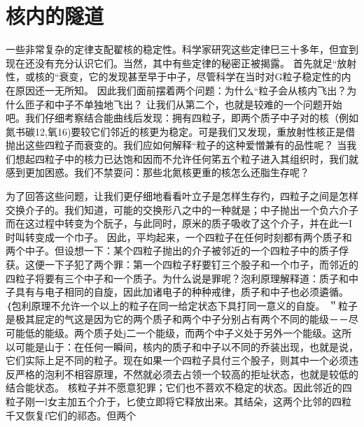 \section{核内的隧道}

一些非常复杂的定律支配翟核的稳定性。科学家研究这些定律巳三十多年，但宜到现在还没有充分认识它们。当然，其中有些定律的秘密正被揭露。
首先就足“放射性，或核的“衰变，它的发现甚至早于中子，尽管科学在当时对G粒子稳定性的内在原因还一无所知。
因此我们面前摆着两个问题：为什么“粒子会从核内飞出？为什么匝子和中子不单独地飞出？
让我们从第二个，也就是较难的一个问题开始吧。我们仔细考察结合能曲线后发现：拥有四粒子，即两个质子中子对的核（例如氮书碳12,氧16)要较它们邻近的核更为稳定。可是我们又发现，重放射性核正是借抛出这些四粒子而衰变的。我们应如何解释“粒子的这种爱憎兼有的品性呢？
当我们想起四粒子中的核力已达饱和因而不允许任何笫五个粒子进入其组织时，我们就感到更加困惑。我们不禁耍问：那些北氮核更重的核怎么还脂生存呢？

为了回答这些问题，让我们更仔细地看看叶立子是怎样生存彴，四粒子之间是怎样交换介子的。我们知道，可能的交换形八之中的一种就是；中子抛出一个负六介子而在这过程中转变为个朊子，与此同时，原米的质子吸收了这个介子，并在此一I时叫转变成一个巾子。
因此，平均起来，一个四粒子在任何时刻都有两个质子和两个中子。但设想一下：某个四粒子抛出的介子被邻近的一个四粒子中的质子俘获。这便一下子犯了两个罪：第一个四粒子籽要钉三个股子和一个巾子，而邻近的四粒子将要有三个中子和一个质子。为什么说是罪呢？泡利原理解释道：质子和中子具有与电子相同的自旋，因此加诸电子的种种戒律，质子和中子也必须遴循。｛包利原理不允许一个以上的粒子在同一给定状态下具打同一意义的自旋。
＂粒子是极其屁定的气这是因为它的两个质子和两个中子分别占有两个不同的能级－－尽可能低的能级。两个质子处j二一个能级，而两个中子义处于另外一个能级。这所以可能是山于：在任何一瞬间，核内的质子和中子以不同的乔装出现，也就是说，它们实际上足不同的粒子。现在如果一个四粒子具付三个股子，则其中一个必须违反严格的泡利不相容原理，不然就必须去占领一个较高的拒址状态，也就是较低的结合能状态。
核粒子并不愿意犯罪；它们也不菩欢不稳定的状态。因此邻近的四粒子刚一l女主加五个介于，匕使立即将它释放出来。其结朵，这两个比邻的四粒千又恢复f它们的祁态。但两个

